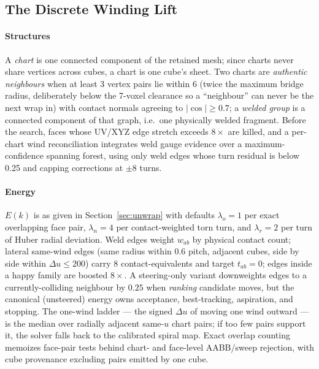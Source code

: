 \subsection{The Discrete Winding Lift}
\label{app:tabu}

\paragraph{Structures} A {\em chart} is one connected component of the retained mesh; since charts never share vertices across cubes, a chart is one cube's sheet. Two charts are {\em authentic neighbours} when at least 3 vertex pairs lie within 6 (twice the maximum bridge radius, deliberately below the 7-voxel clearance so a ``neighbour'' can never be the next wrap in) with contact normals agreeing to $|\!\cos| \ge 0.7$; a {\em welded group} is a connected component of that graph, i.e.\ one physically welded fragment. Before the search, faces whose UV/XYZ edge stretch exceeds $8\times$ are killed, and a per-chart wind reconciliation integrates weld gauge evidence over a maximum-confidence spanning forest, using only weld edges whose turn residual is below 0.25 and capping corrections at $\pm8$ turns.

\paragraph{Energy} $E(k)$ is as given in Section~\ref{sec:unwrap} with defaults $\lambda_o = 1$ per exact overlapping face pair, $\lambda_n = 4$ per contact-weighted torn turn, and $\lambda_r = 2$ per turn of Huber radial deviation. Weld edges weight $w_{ab}$ by physical contact count; lateral same-wind edges (same radius within 0.6 pitch, adjacent cubes, side by side within $\Delta u \le 200$) carry 8 contact-equivalents and target $t_{ab} = 0$; edges inside a happy family are boosted $8\times$. A steering-only variant downweights edges to a currently-colliding neighbour by $0.25$ when {\em ranking} candidate moves, but the canonical (unsteered) energy owns acceptance, best-tracking, aspiration, and stopping. The one-wind ladder --- the signed $\Delta u$ of moving one wind outward --- is the median over radially adjacent same-$u$ chart pairs; if too few pairs support it, the solver falls back to the calibrated spiral map. Exact overlap counting memoizes face-pair tests behind chart- and face-level AABB/sweep rejection, with cube provenance excluding pairs emitted by one cube.


